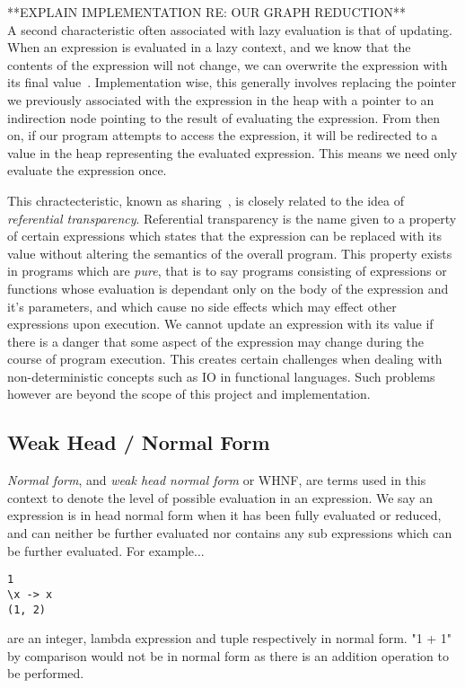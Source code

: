 **EXPLAIN IMPLEMENTATION RE: OUR GRAPH REDUCTION**  \\


A second characteristic often associated with lazy evaluation is that of 
updating. When an expression is evaluated in a lazy context, and we know
that the contents of the expression will not change, we can overwrite the
expression with its final value~\cite[pp.208]{SPJ}. Implementation wise, this generally involves
replacing the pointer we previously associated with the expression in the
heap with a pointer to an indirection node pointing to the result of 
evaluating the expression. From then on, if our program attempts to 
access the expression, it will be redirected to a value in the heap 
representing the evaluated expression. This means we need only evaluate
the expression once. 

This chractecteristic, known as sharing~\cite[pp.208]{SPJ}, is closely related to the idea
of \emph{referential transparency}. Referential transparency is the name
given to a property of certain expressions which states that the expression
can be replaced with its value without altering the semantics of the overall
program. This property exists in programs which are \emph{pure}, that is to
say programs consisting of expressions or functions whose evaluation is 
dependant only on the body of the expression and it's parameters, and which
cause no side effects which may effect other expressions upon execution. 
We cannot update an expression with its value if there is a danger that
some aspect of the expression may change during the course of program 
execution. This creates certain challenges when dealing with non-deterministic
concepts such as IO in functional languages. Such problems however are 
beyond the scope of this project and implementation.

\subsection{Weak Head / Normal Form}
\emph{Normal form}, and \emph{weak head normal form} or WHNF, are terms used
in this context to denote the level of possible evaluation in an expression.
We say an expression is in head normal form when it has been fully evaluated
or reduced, and can neither be further evaluated nor contains any sub
expressions which can be further evaluated. For example...
\begin{verbatim}
1
\x -> x
(1, 2)
\end{verbatim}
are an integer, lambda expression and tuple respectively in normal form. "1 + 1"
by comparison would not be in normal form as there is an addition operation to
be performed.


